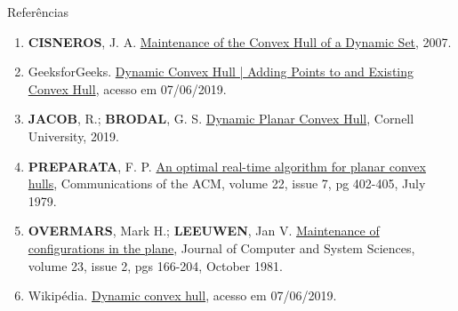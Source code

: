 \begin{frame}[fragile]{Referências}

    \begin{enumerate}

        \item \textbf{CISNEROS}, J. A. \href{https://www.inf.ed.ac.uk/publications/thesis/online/IM070449.pdf}{Maintenance of the Convex Hull of a Dynamic Set}, 2007.
        
        \item GeeksforGeeks. \href{https://www.geeksforgeeks.org/dynamic-convex-hull-adding-points-existing-convex-hull/}{Dynamic Convex Hull | Adding Points to and Existing Convex Hull}, acesso em 07/06/2019.

        \item \textbf{JACOB}, R.; \textbf{BRODAL}, G. S. \href{https://arxiv.org/pdf/1902.11169.pdf}{Dynamic Planar Convex Hull}, Cornell University, 2019.

        \item \textbf{PREPARATA}, F. P. \href{https://dl.acm.org/citation.cfm?id=359132}{An optimal
            real-time algorithm for planar convex hulls}, Communications of the ACM, volume 22,
            issue 7, pg 402-405, July 1979.

        \item \textbf{OVERMARS}, Mark H.; \textbf{LEEUWEN}, Jan V. \href{https://www.sciencedirect.com/science/article/pii/002200008190012X?via\%3Dihub}{Maintenance of configurations in the plane}, Journal of Computer and System Sciences, volume 23, issue 2, pgs 166-204, October 1981.

        \item Wikipédia. \href{https://en.wikipedia.org/wiki/Dynamic_convex_hull}{Dynamic convex hull}, acesso em 07/06/2019.

    \end{enumerate}

\end{frame}
